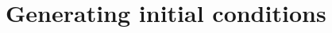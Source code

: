 \documentclass[a4paper]{article}
\newcommand{\var}[1]{\texttt{#1}}
\begin{document}
\begin{itemize}





\end{itemize}








\newpage




\section{Generating initial conditions}
\end{document}
